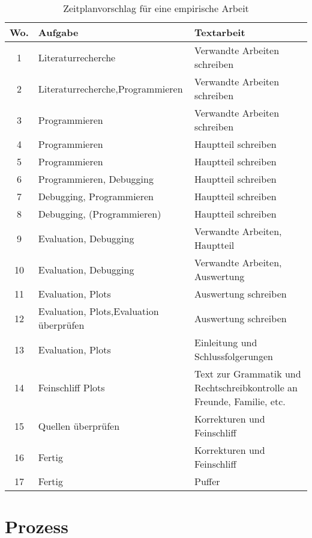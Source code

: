\begin{table}[bt]
\centering
\caption{Zeitplanvorschlag für eine empirische Arbeit}\label{tab:Zeitplan}
\begin{tabular}{@{}cp{60mm}p{70mm}@{}}
\toprule
\textbf{Wo.} & \textbf{Aufgabe} & \textbf{Textarbeit} \\
\midrule
 1 & Literaturrecherche                & Verwandte Arbeiten schreiben \\
 2 & Literaturrecherche,\newline Programmieren & Verwandte Arbeiten schreiben \\
 3 & Programmieren                     & Verwandte Arbeiten schreiben \\
 4 & Programmieren                     & Hauptteil schreiben \\
 5 & Programmieren                     & Hauptteil schreiben \\
 6 & Programmieren, Debugging          & Hauptteil schreiben \\
 7 & Debugging, Programmieren          & Hauptteil schreiben \\
 8 & Debugging, (Programmieren)        & Hauptteil schreiben \\
\midrule
 9 & Evaluation, Debugging             & Verwandte Arbeiten, Hauptteil \\
10 & Evaluation, Debugging             & Verwandte Arbeiten, Auswertung \\
11 & Evaluation, Plots                 & Auswertung schreiben\\
12 & Evaluation, Plots,\newline Evaluation überprüfen & Auswertung schreiben\\
13 & Evaluation, Plots                 & Einleitung und Schlussfolgerungen\\
14 & Feinschliff Plots                 & Text zur Grammatik und Rechtschreibkontrolle an Freunde, Familie, etc. \\
15 & Quellen überprüfen                & Korrekturen und Feinschliff\\
16 & Fertig                            & Korrekturen und Feinschliff\\
\midrule
17 &  Fertig & Puffer \\
\bottomrule
\end{tabular}
\end{table}

\section{Prozess}

